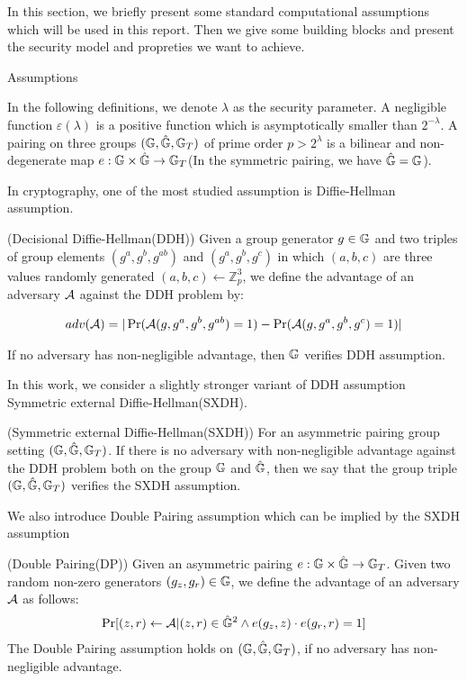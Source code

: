 In this section, we briefly present some standard computational assumptions which will be used in this report.  
Then we give some building blocks and present the security model and propreties we want to achieve.

\begin{subsection}{Assumptions}
  
  In the following definitions, we denote $\lambda$ as the security parameter.
  A negligible function $\varepsilon(\lambda)$ is a positive function which is asymptotically smaller than $2^{-\lambda}$.
  A pairing on three groups $(\mathbb{G}, \hat{\mathbb{G}}, \mathbb{G}_T)$ of prime order $p > 2^\lambda$ is a bilinear and non-degenerate map $e : \mathbb{G} \times \hat{\mathbb{G}} \to \mathbb{G}_T$(In the symmetric pairing, we have $\hat{\mathbb{G}} = \mathbb{G}$). 
  
  In cryptography, one of the most studied assumption is Diffie-Hellman assumption. 

  \begin{myDef}{(Decisional Diffie-Hellman(DDH))}
    Given a group generator $g \in \mathbb{G}$ and two triples of group elements $(g^a, g^b, g^{ab})$ and $(g^a, g^b, g^c)$ in which $(a, b, c)$ are three values randomly generated  $(a, b, c) \gets \mathbb{Z}_p^3$, we define the advantage of an adversary $\mathcal{A}$ against the DDH problem by:

    \begin{align*}
      adv(\mathcal{A}) = |\operatorname{Pr}(\mathcal{A}(g, g^a, g^b, g^{ab}) = 1) - \operatorname{Pr}(\mathcal{A}(g, g^a, g^b, g^c) = 1)|
    \end{align*}

    If no adversary has non-negligible advantage, then $\mathbb{G}$ verifies DDH assumption.
  \end{myDef}

  In this work, we consider a slightly stronger variant of DDH assumption Symmetric external Diffie-Hellman(SXDH).
  
  \begin{myDef}{(Symmetric external Diffie-Hellman(SXDH))}
    For an asymmetric pairing group setting $(\mathbb{G}, \hat{\mathbb{G}}, \mathbb{G}_T)$. If there is no adversary with non-negligible advantage against the DDH problem both on the group $\mathbb{G}$ and $\hat{\mathbb{G}}$, then we say that the group triple $(\mathbb{G}, \hat{\mathbb{G}}, \mathbb{G}_T)$ verifies the SXDH assumption.
  \end{myDef}

  We also introduce Double Pairing assumption which can be implied by the SXDH assumption
  
  \begin{myDef}{(Double Pairing(DP))}
    Given an asymmetric pairing $e:\mathbb{G} \times \hat{\mathbb{G}} \to \mathbb{G}_T$. Given two random non-zero generators $(g_z, g_r) \in \mathbb{G}$, we define the advantage of an adversary $\mathcal{A}$ as follows:
    \begin{align*}
      \operatorname{Pr}[(z, r) \gets \mathcal{A}| (z, r)\in \hat{\mathbb{G}}^2 \wedge e(g_z, z) \cdot e(g_r, r) = 1]
    \end{align*}
    The Double Pairing assumption holds on $(\mathbb{G}, \hat{\mathbb{G}}, \mathbb{G}_T)$, if no adversary has non-negligible advantage.
  \end{myDef}


\end{subsection}
